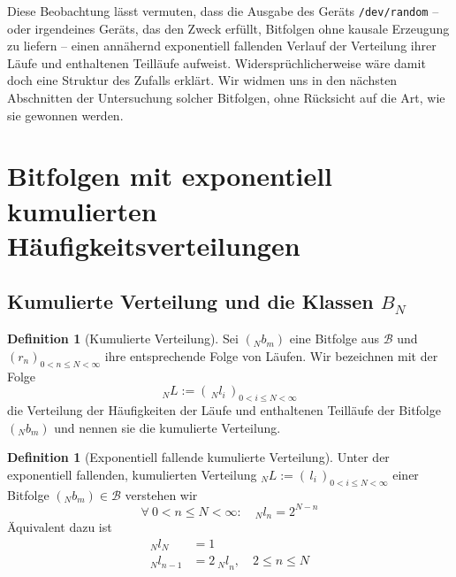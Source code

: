 \documentclass[11pt,a4paper]{scrartcl}
\theoremstyle{plain}
\theoremstyle{definition}
\newtheorem{defi}[satz]{Definition}
\theoremstyle{remark}
\begin{document}
Diese Beobachtung lässt vermuten, dass die Ausgabe des Geräts
\texttt{/dev/random} -- oder irgendeines Geräts, das den Zweck erfüllt,
Bitfolgen ohne kausale Erzeugung zu liefern -- einen annähernd
exponentiell fallenden Verlauf der Verteilung ihrer Läufe und
enthaltenen Teilläufe aufweist. Widersprüchlicherweise wäre damit doch
eine Struktur des Zufalls erklärt. Wir widmen uns in den nächsten
Abschnitten der Untersuchung solcher Bitfolgen, ohne Rücksicht auf die
Art, wie sie gewonnen werden.

\section{Bitfolgen mit exponentiell kumulierten
Häufigkeitsverteilungen}\label{sec:klassen}

\subsection{Kumulierte Verteilung und die Klassen \texorpdfstring{$B_N$}{B\_N}}

\begin{defi}[Kumulierte Verteilung]\label{defi:kumulierteverteilung}
Sei $(_Nb_m)$ eine Bitfolge aus $\mathcal B$ und
$(r_n)_{0<n\leq N<\infty}$ ihre entsprechende Folge von Läufen. Wir
bezeichnen mit der Folge
\begin{equation}\label{eqn:defkumuliert}
  _NL:=(\,_Nl_i\,)_{0<i\leq N<\infty}
\end{equation}
die Verteilung der Häufigkeiten der Läufe und enthaltenen Teilläufe
der Bitfolge $(_Nb_m)$ und nennen sie die kumulierte Verteilung.
\end{defi}

\begin{defi}[Exponentiell fallende kumulierte Verteilung]\label{defi:exponentiell}
Unter der exponentiell fallenden, kumulierten Verteilung
$_NL:=(\,l_i\,)_{0<i\leq N<\infty}$ einer Bitfolge
$(_Nb_m)\in\mathcal B$ verstehen wir
\begin{equation}\label{eqn:exponentiellerverlauf}
  \forall\ 0<n\leq N<\infty:\quad _Nl_n=2^{N-n}
\end{equation}
Äquivalent dazu ist
\begin{align}
  _Nl_N&=1\label{eqn:ln gleich 1}\\
  _Nl_{n-1}&=2\ {_Nl}_n,\quad 2\leq n\leq N\label{eqn:lnminus1 gleich 2 ln}
\end{align}
\end{defi}
\end{document}
